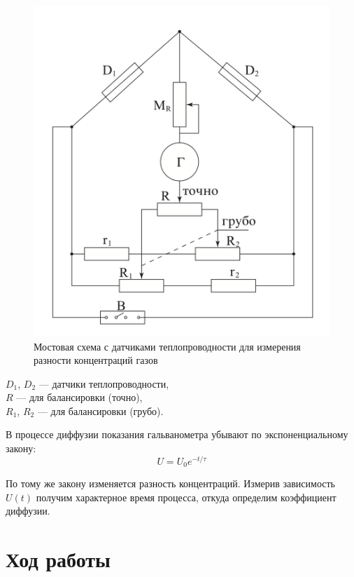 \documentclass[a4paper,12pt]{article} %
\begin{document}
\begin{figure}[h]
  \centering
  \includegraphics[scale = 0.40]{bridge.png}
  \caption{Мостовая схема с датчиками теплопроводности для измерения разности концентраций газов}
  \label{fig:bridge}
\end{figure}

\noindent $D_1$, $D_2$ — датчики теплопроводности, \\
$R$ — для балансировки (точно), \\
$R_1$, $R_2$ — для балансировки (грубо).

В процессе диффузии показания гальванометра убывают по экспоненциальному закону:
\begin{equation}
  U = U_0 e^{-t/\tau}
\end{equation}

По тому же закону изменяется разность концентраций. Измерив зависимость $U(t)$ получим характерное время процесса, откуда определим коэффициент диффузии.

\section*{Ход работы}
\end{document}
